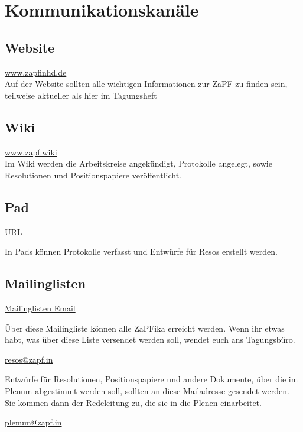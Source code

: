 
\section{Kommunikationskanäle}

\subsection{Website}
\url{www.zapfinhd.de}\\

\noindent Auf der Website sollten alle wichtigen Informationen zur ZaPF zu finden sein, teilweise aktueller als hier im Tagungsheft

\subsection{Wiki}
\url{www.zapf.wiki}\\

\noindent Im Wiki werden die Arbeitskreise angekündigt, Protokolle angelegt, sowie Resolutionen und Positionspapiere veröffentlicht.

\subsection{Pad}
\url{URL}\\ 

\noindent In Pads können Protokolle verfasst und Entwürfe für Resos erstellt werden.

\subsection{Mailinglisten}
\url{Mailinglisten Email}\\ 

\noindent Über diese Mailingliste können alle ZaPFika erreicht werden. Wenn ihr etwas habt, was über diese Liste versendet werden soll, wendet euch ans Tagungsbüro.

\url{resos@zapf.in}

Entwürfe für Resolutionen, Positionspapiere und andere Dokumente, über die im Plenum abgestimmt werden soll, sollten an diese Mailadresse gesendet werden. Sie kommen dann der Redeleitung zu, die sie in die Plenen einarbeitet.

\url{plenum@zapf.in}

